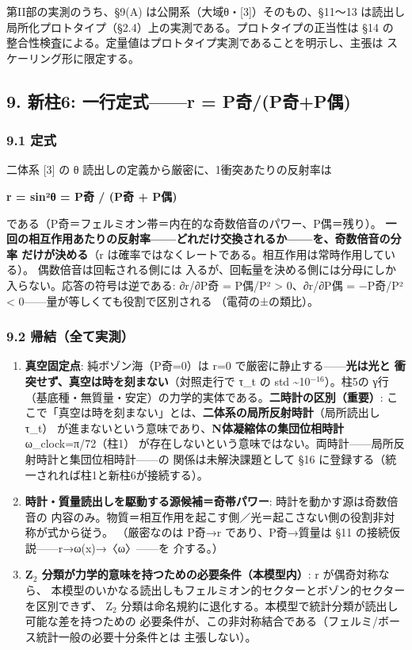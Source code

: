 \documentclass[
]{ltjarticle}
\providecommand{\tightlist}{%
  \setlength{\itemsep}{0pt}\setlength{\parskip}{0pt}}
\begin{document}
第II部の実測のうち、§9(A) は公開系（大域θ・{[}3{]}）そのもの、§11〜13
は読出し
局所化プロトタイプ（§2.4）上の実測である。プロトタイプの正当性は §14 の
整合性検査による。定量値はプロトタイプ実測であることを明示し、主張は
スケーリング形に限定する。

\subsection{9. 新柱6: 一行定式------r =
P奇/(P奇+P偶)}\label{ux65b0ux67f16-ux4e00ux884cux5b9aux5f0fr-pux5947pux5947pux5076}

\subsubsection{9.1 定式}\label{ux5b9aux5f0f}

二体系 {[}3{]} の θ 読出しの定義から厳密に、1衝突あたりの反射率は

\textbf{r = sin²θ = P奇 / (P奇 + P偶)}

である（P奇＝フェルミオン帯＝内在的な奇数倍音のパワー、P偶＝残り）。
\textbf{一回の相互作用あたりの反射率------どれだけ交換されるか------を、奇数倍音の分率
だけが決める}（r
は確率ではなくレートである。相互作用は常時作用している）。
偶数倍音は回転される側には
入るが、回転量を決める側には分母にしか入らない。応答の符号は逆である:
∂r/∂P奇 = P偶/P² \textgreater{} 0、∂r/∂P偶 = −P奇/P² \textless{}
0------量が等しくても役割で区別される （電荷の±の類比）。

\subsubsection{9.2
帰結（全て実測）}\label{ux5e30ux7d50ux5168ux3066ux5b9fux6e2c}

\begin{enumerate}
\def\labelenumi{\arabic{enumi}.}
\tightlist
\item
  \textbf{真空固定点}: 純ボゾン海（P奇=0）は r=0
  で厳密に静止する------\textbf{光は光と
  衝突せず、真空は時を刻まない}（対照走行で τ\_t の std
  \textasciitilde10\(^{-16}\)）。柱5の
  γ行（基底種・無質量・安定）の力学的実体である。\textbf{二時計の区別（重要）}:
  ここで「真空は時を刻まない」とは、\textbf{二体系の局所反射時計}（局所読出し
  τ\_t） が進まないという意味であり、\textbf{N体凝縮体の集団位相時計}
  ω\_clock=π/72（柱1）
  が存在しないという意味ではない。両時計------局所反射時計と集団位相時計------の
  関係は未解決課題として §16
  に登録する（統一されれば柱1と新柱6が接続する）。
\item
  \textbf{時計・質量読出しを駆動する源候補＝奇帯パワー}:
  時計を動かす源は奇数倍音の
  内容のみ。物質＝相互作用を起こす側／光＝起こさない側の役割非対称が式から従う。
  （厳密なのは P奇→r であり、P奇→質量は §11
  の接続仮説------r→ω(x)→〈ω〉------を 介する。）
\item
  \textbf{Z\(_{2}\) 分類が力学的意味を持つための必要条件（本模型内）}: r
  が偶奇対称なら、
  本模型のいかなる読出しもフェルミオン的セクターとボゾン的セクターを区別できず、
  Z\(_{2}\)
  分類は命名規約に退化する。本模型で統計分類が読出し可能な差を持つための
  必要条件が、この非対称結合である（フェルミ/ボース統計一般の必要十分条件とは
  主張しない）。
\end{enumerate}
\end{document}
